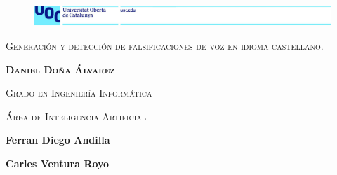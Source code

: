 \thispagestyle{empty}


\begin{figure}[ht]
\includegraphics[width=19cm]{img/head.jpg}
\end{figure}

\vspace{8cm}

\begin{center}
{\scshape\LARGE {Generación y detección de falsificaciones \linebreak
de voz en idioma castellano.} \par}
\vspace{0.5cm}
{\scshape\large \textbf{Daniel Doña Álvarez} \par}
\vspace{5cm}
{\scshape\large Grado en Ingeniería Informática \par}
{\scshape\large Área de Inteligencia Artificial \par}




\end{center}

\vspace*{\fill}

\begin{flushleft}

\textbf{Ferran Diego Andilla}

\textbf{Carles Ventura Royo}

\end{flushleft}

\restoregeometry
\newpage